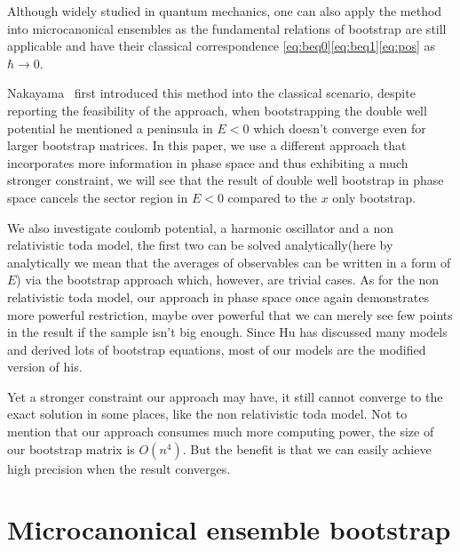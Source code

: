 \documentclass[aps, preprint,amsmath, amssymb]{revtex4-2}
\begin{document}
Although widely studied in quantum mechanics, one can also apply the method into microcanonical ensembles as the fundamental relations of bootstrap are still applicable and have their classical correspondence \eqref{eq:beq0}\eqref{eq:beq1}\eqref{eq:pos} as $\hbar \to 0$.

Nakayama~\cite{Nakayama_2022} first introduced this method into the classical scenario, despite reporting the feasibility of the approach, when bootstrapping the double well potential he mentioned a peninsula in $ E < 0$ which doesn't converge even for larger bootstrap matrices. In this paper, we use a different approach that incorporates more information in phase space and thus exhibiting a much stronger constraint, we will see that the result of double well bootstrap in phase space cancels the sector region in $E < 0$ compared to the $x$ only bootstrap.

We also investigate coulomb potential, a harmonic oscillator and a non relativistic toda model, the first two can be solved analytically(here by analytically we mean that the averages of observables can be written in a form of $E$) via the bootstrap approach which, however, are trivial cases. As for the non relativistic toda model, our approach in phase space once again demonstrates more powerful restriction, maybe over powerful that we can merely see few points in the result if the sample isn't big enough.
Since Hu\cite{Hu:2022keu} has discussed many models and derived lots of bootstrap equations, most of our models are the modified version of his.

Yet a stronger constraint our approach may have, it still cannot converge to the exact solution in some places, like the non relativistic toda model. Not to mention that our approach consumes much more computing power, the size of our bootstrap matrix is ${O}(n^4)$. But the benefit is that we can easily achieve high precision when the result converges.

\section{Microcanonical ensemble bootstrap}
\end{document}
